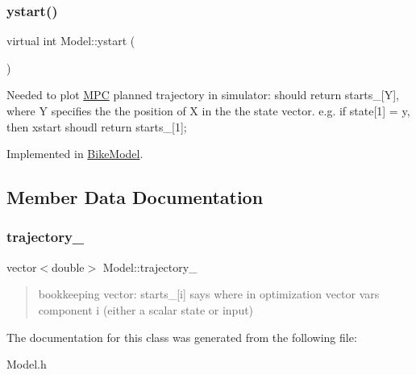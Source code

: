 \subsubsection{\texorpdfstring{ystart()}{ystart()}}
{\footnotesize\ttfamily virtual int Model\+::ystart (\begin{DoxyParamCaption}{ }\end{DoxyParamCaption})\hspace{0.3cm}{\ttfamily [pure virtual]}}

Needed to plot \mbox{\hyperlink{classMPC}{M\+PC}} planned trajectory in simulator\+: should return starts\+\_\+\mbox{[}Y\mbox{]}, where Y specifies the the position of X in the the state vector. e.\+g. if state\mbox{[}1\mbox{]} = y, then xstart shoudl return starts\+\_\+\mbox{[}1\mbox{]}; 

Implemented in \mbox{\hyperlink{classBikeModel_a05b988f106df902d1222dfb662d4b1fa}{Bike\+Model}}.



\subsection{Member Data Documentation}
\mbox{\label{classModel_aa44a513ae9e81e8d3ed3e2add680367f}} 
\subsubsection{\texorpdfstring{trajectory\+\_\+}{trajectory\_}}
{\footnotesize\ttfamily vector$<$double$>$ Model\+::trajectory\+\_\+\hspace{0.3cm}{\ttfamily [protected]}}

\begin{quote}
bookkeeping vector\+: starts\+\_\+\mbox{[}i\mbox{]} says where in optimization vector vars component i (either a scalar state or input) \end{quote}


The documentation for this class was generated from the following file\+:\begin{DoxyCompactItemize}
\item 
Model.\+h\end{DoxyCompactItemize}

